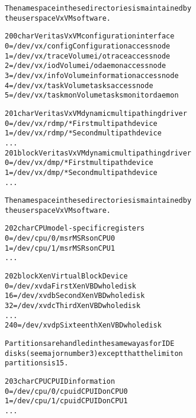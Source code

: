 \documentclass[a4paper,8pt,english]{sphinxmanual}
\begin{document}
\begin{alltt}
                The namespace in these directories is maintained by
                the user space VxVM software.

 200 char       Veritas VxVM configuration interface
                   0 = /dev/vx/config           Configuration access node
                   1 = /dev/vx/trace            Volume i/o trace access node
                   2 = /dev/vx/iod              Volume i/o daemon access node
                   3 = /dev/vx/info             Volume information access node
                   4 = /dev/vx/task             Volume tasks access node
                   5 = /dev/vx/taskmon          Volume tasks monitor daemon

 201 char       Veritas VxVM dynamic multipathing driver
                  0 = /dev/vx/rdmp/*            First multipath device
                  1 = /dev/vx/rdmp/*            Second multipath device
                    ...
 201 block      Veritas VxVM dynamic multipathing driver
                  0 = /dev/vx/dmp/*             First multipath device
                  1 = /dev/vx/dmp/*             Second multipath device
                    ...

                The namespace in these directories is maintained by
                the user space VxVM software.

 202 char       CPU model-specific registers
                  0 = /dev/cpu/0/msr            MSRs on CPU 0
                  1 = /dev/cpu/1/msr            MSRs on CPU 1
                    ...

 202 block      Xen Virtual Block Device
                  0 = /dev/xvda       First Xen VBD whole disk
                  16 = /dev/xvdb      Second Xen VBD whole disk
                  32 = /dev/xvdc      Third Xen VBD whole disk
                    ...
                  240 = /dev/xvdp     Sixteenth Xen VBD whole disk

                Partitions are handled in the same way as for IDE
                disks (see major number 3) except that the limit on
                partitions is 15.

 203 char       CPU CPUID information
                  0 = /dev/cpu/0/cpuid          CPUID on CPU 0
                  1 = /dev/cpu/1/cpuid          CPUID on CPU 1
                    ...


\end{alltt}
\end{document}
